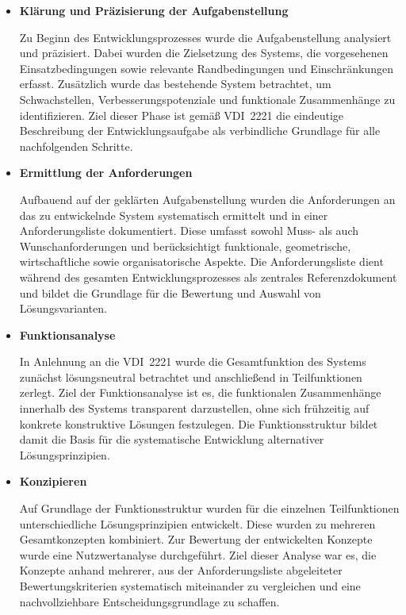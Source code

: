 \begin{itemize}
    \item \textbf{Klärung und Präzisierung der Aufgabenstellung}  

    Zu Beginn des Entwicklungsprozesses wurde die Aufgabenstellung analysiert und 
    präzisiert. Dabei wurden die Zielsetzung des Systems, die vorgesehenen Einsatzbedingungen 
    sowie relevante Randbedingungen und Einschränkungen erfasst. Zusätzlich wurde das 
    bestehende System betrachtet, um Schwachstellen, Verbesserungspotenziale und 
    funktionale Zusammenhänge zu identifizieren. Ziel dieser Phase ist gemäß VDI~2221 
    die eindeutige Beschreibung der Entwicklungsaufgabe als verbindliche Grundlage 
    für alle nachfolgenden Schritte.

    \item \textbf{Ermittlung der Anforderungen}  

    Aufbauend auf der geklärten Aufgabenstellung wurden die Anforderungen an das zu 
    entwickelnde System systematisch ermittelt und in einer Anforderungsliste 
    dokumentiert. Diese umfasst sowohl Muss- als auch Wunschanforderungen und 
    berücksichtigt funktionale, geometrische, wirtschaftliche sowie organisatorische 
    Aspekte. Die Anforderungsliste dient während des gesamten Entwicklungsprozesses 
    als zentrales Referenzdokument und bildet die Grundlage für die Bewertung und 
    Auswahl von Lösungsvarianten.

    \item \textbf{Funktionsanalyse}  

    In Anlehnung an die VDI~2221 wurde die Gesamtfunktion des Systems zunächst 
    lösungsneutral betrachtet und anschließend in Teilfunktionen zerlegt. Ziel der 
    Funktionsanalyse ist es, die funktionalen Zusammenhänge innerhalb des Systems 
    transparent darzustellen, ohne sich frühzeitig auf konkrete konstruktive 
    Lösungen festzulegen. Die Funktionsstruktur bildet damit die Basis für die 
    systematische Entwicklung alternativer Lösungsprinzipien.

    \item \textbf{Konzipieren}  

    Auf Grundlage der Funktionsstruktur wurden für die einzelnen Teilfunktionen 
    unterschiedliche Lösungsprinzipien entwickelt. Diese wurden zu mehreren 
    Gesamtkonzepten kombiniert. Zur Bewertung der entwickelten Konzepte wurde eine 
    Nutzwertanalyse durchgeführt. Ziel dieser Analyse war es, die Konzepte anhand 
    mehrerer, aus der Anforderungsliste abgeleiteter Bewertungskriterien systematisch 
    miteinander zu vergleichen und eine nachvollziehbare Entscheidungsgrundlage zu 
    schaffen.


\end{itemize}
